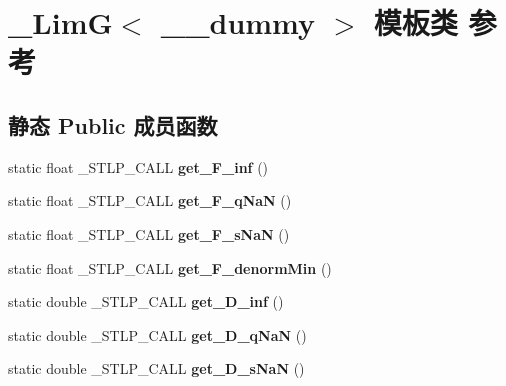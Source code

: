 \hypertarget{class___lim_g}{}\section{\+\_\+\+LimG$<$ \+\_\+\+\_\+dummy $>$ 模板类 参考}
\label{class___lim_g}
\subsection*{静态 Public 成员函数}
\begin{DoxyCompactItemize}
\item 
\mbox{\label{class___lim_g_aed1088001d23f45ac973e5e0da2dcd5f}} 
static float \+\_\+\+S\+T\+L\+P\+\_\+\+C\+A\+LL {\bfseries get\+\_\+\+F\+\_\+inf} ()
\item 
\mbox{\label{class___lim_g_a7ceca3c52fd1977ee9d8bb3cef5f941b}} 
static float \+\_\+\+S\+T\+L\+P\+\_\+\+C\+A\+LL {\bfseries get\+\_\+\+F\+\_\+q\+NaN} ()
\item 
\mbox{\label{class___lim_g_a653cc4d3d3a18a94ed2fee4a554d8784}} 
static float \+\_\+\+S\+T\+L\+P\+\_\+\+C\+A\+LL {\bfseries get\+\_\+\+F\+\_\+s\+NaN} ()
\item 
\mbox{\label{class___lim_g_affc388b835ac4e00d413d72d655c5610}} 
static float \+\_\+\+S\+T\+L\+P\+\_\+\+C\+A\+LL {\bfseries get\+\_\+\+F\+\_\+denorm\+Min} ()
\item 
\mbox{\label{class___lim_g_a7b4c148f5eec468cb1f3818301d319ff}} 
static double \+\_\+\+S\+T\+L\+P\+\_\+\+C\+A\+LL {\bfseries get\+\_\+\+D\+\_\+inf} ()
\item 
\mbox{\label{class___lim_g_a3786a1e6f26f2964fe36247ceb084352}} 
static double \+\_\+\+S\+T\+L\+P\+\_\+\+C\+A\+LL {\bfseries get\+\_\+\+D\+\_\+q\+NaN} ()
\item 
\mbox{\label{class___lim_g_a9f1d389f6bdc9c7a495bd491e9a7b0a8}} 
static double \+\_\+\+S\+T\+L\+P\+\_\+\+C\+A\+LL {\bfseries get\+\_\+\+D\+\_\+s\+NaN} ()
\item 
\mbox{\label{class___lim_g_ae87ae9006c840a5dfcc26f46776fa718}} 

\end{DoxyCompactItemize}
